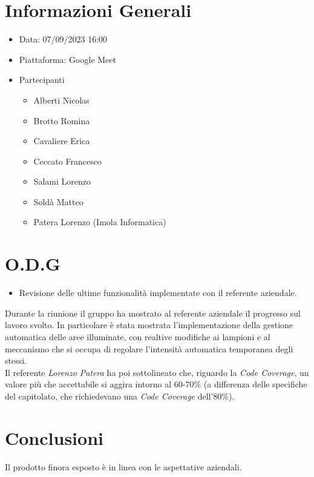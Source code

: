 \documentclass[a4paper, 12pt]{article}
\begin{document}
\makefrontpage
\section*{Informazioni Generali}
\begin{itemize}
    \item Data: 07/09/2023 16:00
    \item Piattaforma: Google Meet
    \item Partecipanti
          \begin{itemize}
              \item Alberti Nicolas
              \item Brotto Romina
              \item Cavaliere Erica
              \item Ceccato Francesco
              \item Salami Lorenzo
              \item Soldà Matteo
              \item Patera Lorenzo (Imola Informatica)
          \end{itemize}
\end{itemize}
\section*{O.D.G}
\begin{itemize}
    \item Revisione delle ultime funzionalità implementate con il referente aziendale.
\end{itemize}




 Durante la riunione il gruppo ha mostrato al referente aziendale il progresso sul 
lavoro svolto. In particolare è stata mostrata l'implementazione della gestione 
automatica delle aree illuminate, con realtive modifiche ai lampioni e al meccanismo 
che si occupa di regolare l'intensità automatica temporanea degli stessi.\\
Il referente \textit{Lorenzo Patera} ha poi sottolineato che, riguardo la 
\textit{Code Coverage}, un valore più che accettabile si aggira intorno al 
60-70\% (a differenza delle specifiche del capitolato, che richiedevano una 
\textit{Code Coverage} dell'80\%).




\section*{Conclusioni}
Il prodotto finora esposto è in linea con le aspettative aziendali.
\end{document}
